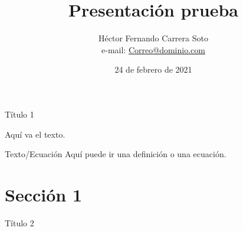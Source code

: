 \documentclass[12pt,letterpaper, xcolor=dvipsnames]{beamer}
\author{Héctor Fernando Carrera Soto \\ 
e-mail: \url{Correo@dominio.com}}
\title{Presentación prueba}
\institute{USAC}
\date{24 de febrero de 2021}
\begin{document}
\frame{\titlepage}



\begin{frame}{Título 1}

	Aquí va el texto.

	\begin{block}{Texto/Ecuación}
	Aquí puede ir una definición o una ecuación.
	\end{block}

\end{frame}


\section{Sección 1}
\begin{frame}{Título 2}


\end{frame}
\end{document}
